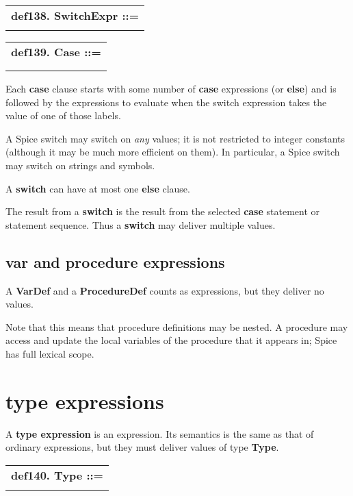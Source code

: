\documentclass{report}
\begin{document}
\begin{tabular}{l}
{\bf def138. SwitchExpr ::= }\\ 
\hspace*{3mm}{\tt "switch" Expr Case+ "endswitch"} \\ 
\end{tabular}

\begin{tabular}{l}
{\bf def139. Case ::= }\\ 
\hspace*{3mm}{\tt ("case" Expr)+ "then" StatementSeq} \\ 
\hspace*{3mm}{\tt  $\mid$ "else" StatementSeq} \\ 
\end{tabular}

Each {\bf case} clause starts with some number of {\bf case} expressions (or
{\bf else}) and is followed by the expressions to evaluate when the switch
expression takes the value of one of those labels.

A Spice switch may switch on {\em any} values; it is not restricted to integer
constants (although it may be much more efficient on them). In particular, a
Spice switch may switch on strings and symbols.

A {\bf switch} can have at most one {\bf else} clause.

The result from a {\bf switch} is the result from the selected {\bf case} statement or
statement sequence. Thus a {\bf switch} may deliver multiple values.\subsection{var and procedure expressions}


A {\bf VarDef} and a {\bf ProcedureDef} counts as expressions, but they deliver
no values.

Note that this means that procedure definitions may be nested. A
procedure may access and update the local variables of the procedure that it
appears in; Spice has full lexical scope.\section{type expressions}


A {\bf type expression} is an expression. Its semantics is the same as that of
ordinary expressions, but they must deliver values of type {\bf Type}.

\begin{tabular}{l}
{\bf def140. Type ::= }\\ 
\hspace*{3mm}{\tt Expr} \\ 
\end{tabular}
\end{document}
